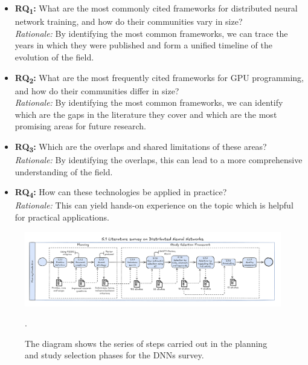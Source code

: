 \label{sec:research_questions_refined}
\begin{itemize}
	\item \textbf{RQ\textsubscript{1}:} What are the most commonly cited
	      frameworks for distributed neural network training, and how do their communities vary in size? \\
	      \textit{Rationale:} By identifying the most common frameworks, we can trace the years in which they were published
	      and form a unified timeline of the evolution of the field.

	\item \textbf{RQ\textsubscript{2}:} What are the most frequently cited
	      frameworks for GPU programming, and how do their communities differ in size?\\
	      \textit{Rationale:} By identifying the most common frameworks, we can identify which are the gaps
	      in the literature they cover and which are the most promising areas for future research.

	\item \textbf{RQ\textsubscript{3}:} Which are the overlaps and shared limitations of these areas? \\
	      \textit{Rationale:} By identifying the overlaps, this can lead to a more comprehensive understanding of the field.

	\item \textbf{RQ\textsubscript{4}:} How can these technologies be applied in practice? \\
	      \textit{Rationale:} This can yield hands-on experience on the topic which is helpful for practical applications.

\end{itemize}
\begin{figure}[th]
	\centering
	\includegraphics[width=\linewidth]{figures/survey-dnn.pdf}
	\caption{The diagram shows the series of steps carried out in the planning and study selection
		phases for the DNNs survey.}.
	\label{fig:workflow-study-dnn}
\end{figure}
